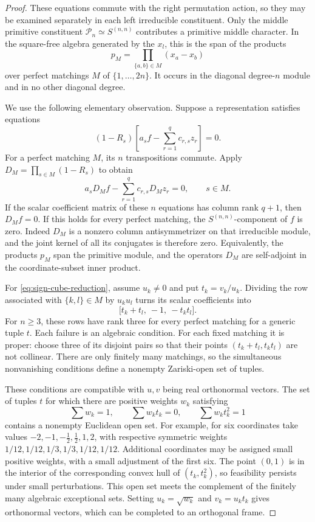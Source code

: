 \begin{proof}
These equations commute with the right permutation action, so they
may be examined separately in each left irreducible constituent.
Only the middle primitive constituent
\(\mathcal P_n\simeq S^{(n,n)}\) contributes a primitive middle
character.  In the square-free algebra generated by the \(x_l\),
this is the span of the products
\[
 p_M=\prod_{\{a,b\}\in M}(x_a-x_b)
\]
over perfect matchings \(M\) of \(\{1,\ldots,2n\}\).
It occurs in the diagonal degree-\(n\) module and in no other
diagonal degree.

We use the following elementary observation.  Suppose a representation
satisfies equations
\[
 (1-R_s)\left[a_sf-\sum_{r=1}^q c_{r,s}z_r\right]=0.
\]
For a perfect matching \(M\), its \(n\) transpositions commute.
Apply \(D_M=\prod_{s\in M}(1-R_s)\) to obtain
\begin{equation}
 a_sD_Mf-\sum_{r=1}^q c_{r,s}D_Mz_r=0,\qquad s\in M.
 \label{eq:sign-cube-matching}
\end{equation}
If the scalar coefficient matrix of these \(n\) equations has
column rank \(q+1\), then \(D_Mf=0\).
If this holds for every perfect matching, the
\(S^{(n,n)}\)-component of \(f\) is zero.  Indeed \(D_M\) is a
nonzero column antisymmetrizer on that irreducible module, and the
joint kernel of all its conjugates is therefore zero.  Equivalently,
the products \(p_M\) span the primitive module, and the operators
\(D_M\) are self-adjoint in the coordinate-subset inner product.

For \eqref{eq:sign-cube-reduction}, assume \(u_k\ne0\) and put \(t_k=v_k/u_k\).
Dividing the row associated with \(\{k,l\}\in M\) by \(u_ku_l\)
turns its scalar coefficients into
\begin{equation}
 \bigl[t_k+t_l,\ -1,\ -t_kt_l\bigr].
 \label{eq:sign-cube-rank}
\end{equation}
For \(n\ge3\), these rows have rank three for every perfect matching
for a generic tuple \(t\).  Each failure is an algebraic condition.
For each fixed matching it is proper: choose three of its disjoint
pairs so that their points
\((t_k+t_l,t_kt_l)\) are not collinear.
There are only finitely many matchings, so the simultaneous
nonvanishing conditions define a nonempty Zariski-open set of
tuples.

These conditions are compatible with \(u,v\) being real orthonormal
vectors.  The set of tuples \(t\) for which there are positive
weights \(w_k\) satisfying
\[
 \sum w_k=1,\qquad \sum w_kt_k=0,\qquad \sum w_kt_k^2=1
\]
contains a nonempty Euclidean open set.  For example, for six
coordinates take values
\(-2,-1,-\tfrac12,\tfrac12,1,2\), with respective symmetric
weights \(1/12,1/12,1/3,1/3,1/12,1/12\).
Additional coordinates may be assigned small positive weights,
with a small adjustment of the first six.  The point \((0,1)\)
is in the interior of the corresponding convex hull of
\((t_k,t_k^2)\), so feasibility persists under small perturbations.
This open set meets the complement of the finitely many algebraic
exceptional sets.  Setting \(u_k=\sqrt{w_k}\) and
\(v_k=u_kt_k\) gives orthonormal vectors, which can be completed
to an orthogonal frame.


\end{proof}
